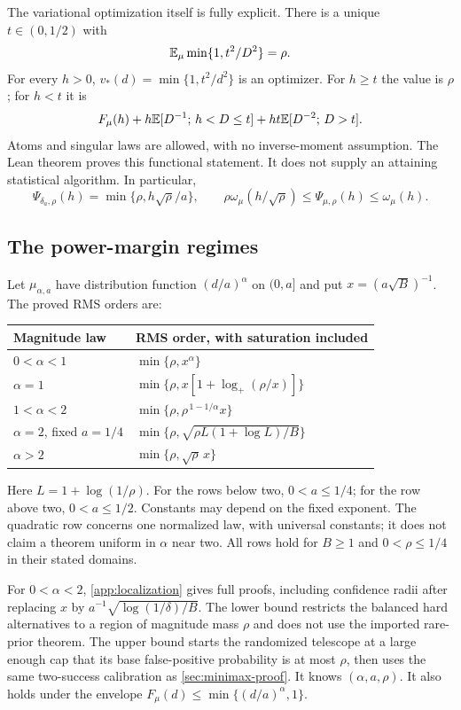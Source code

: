 The variational optimization itself is fully explicit. There is a unique
$t\in(0,1/2)$ with
\[
 \mathbb E_\mu\min\{1,t^2/D^2\}=\rho.
\]
For every $h>0$, $v_*(d)=\min\{1,t^2/d^2\}$ is an optimizer. For $h\ge t$
the value is $\rho$; for $h<t$ it is
\begin{equation}\label{eq:v5-psi-form}
 F_\mu(h)+h\mathbb E[D^{-1};\,h<D\le t]+ht\mathbb E[D^{-2};\,D>t].
\end{equation}
Atoms and singular laws are allowed, with no inverse-moment assumption.
The Lean theorem
 proves this
functional statement. It does not supply an attaining statistical
algorithm. In particular,
\[
 \Psi_{\delta_a,\rho}(h)=\min\{\rho,h\sqrt\rho/a\},\qquad
 \rho\omega_\mu(h/\sqrt\rho)\le\Psi_{\mu,\rho}(h)\le\omega_\mu(h).
\]

\subsection{The power-margin regimes}
Let $\mu_{\alpha,a}$ have distribution function $(d/a)^\alpha$ on
$(0,a]$ and put $x=(a\sqrt B)^{-1}$. The proved RMS orders are:
\begin{center}
\renewcommand{\arraystretch}{1.4}
\begin{tabular}{@{}ll@{}}
\toprule
Magnitude law & RMS order, with saturation included\\
\midrule
$0<\alpha<1$ & $\min\{\rho,x^\alpha\}$\\
$\alpha=1$ & $\min\{\rho,x[1+\log_+(\rho/x)]\}$\\
$1<\alpha<2$ & $\min\{\rho,\rho^{\,1-1/\alpha}x\}$\\
$\alpha=2$, fixed $a=1/4$
 & $\min\{\rho,\sqrt{\rho L(1+\log L)/B}\}$\\
$\alpha>2$ & $\min\{\rho,\sqrt\rho\,x\}$\\
\bottomrule
\end{tabular}
\end{center}
Here $L=1+\log(1/\rho)$. For the rows below two, $0<a\le1/4$;
for the row above two, $0<a\le1/2$. Constants may depend on the fixed
exponent. The quadratic row concerns one normalized law, with universal
constants; it does not claim a theorem uniform in $\alpha$ near two.
All rows hold for $B\ge1$ and $0<\rho\le1/4$ in their stated domains.

For $0<\alpha<2$, \cref{app:localization} gives full proofs, including
confidence radii after replacing $x$ by
$a^{-1}\sqrt{\log(1/\delta)/B}$. The lower bound restricts the balanced
hard alternatives to a region of magnitude mass $\rho$ and does not
use the imported rare-prior theorem. The upper bound starts the
randomized telescope at a large enough cap that its base false-positive
probability is at most $\rho$, then uses the same two-success
calibration as \cref{sec:minimax-proof}. It knows $(\alpha,a,\rho)$.
It also holds under the envelope
$F_\mu(d)\le\min\{(d/a)^\alpha,1\}$.

